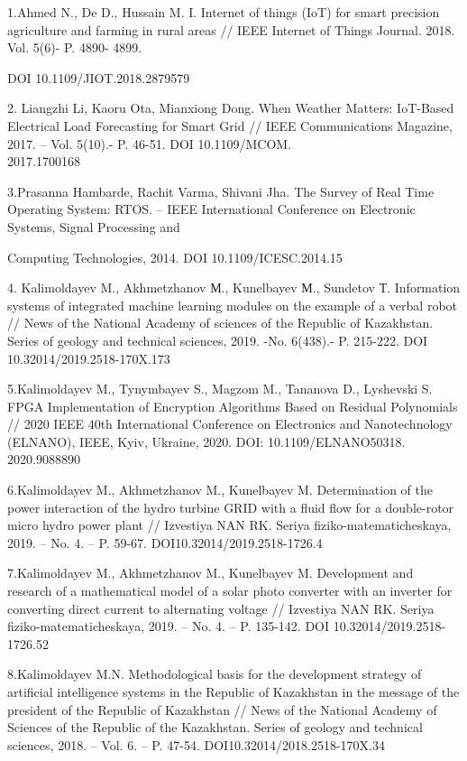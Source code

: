 \begin{noparindent}

1.Ahmed N., De D., Hussain M. I. Internet of things (IoT) for smart
precision agriculture and farming in rural areas // IEEE Internet of
Things Journal. 2018. Vol. 5(6)- P. 4890- 4899.

DOI 10.1109/JIOT.2018.2879579

2. Liangzhi Li, Kaoru Ota, Mianxiong Dong. When Weather Matters:
IoT-Based Electrical Load Forecasting for Smart Grid // IEEE
Communications Magazine, 2017. -- Vol. 5(10).- P. 46-51. DOI
10.1109/MCOM.\\2017.1700168

3.Prasanna Hambarde, Rachit Varma, Shivani Jha. The Survey of Real Time
Operating System: RTOS. -- IEEE International Conference on Electronic
Systems, Signal Processing and

Computing Technologies, 2014. DOI 10.1109/ICESC.2014.15

4. Kalimoldayev M., Akhmetzhanov М., Kunelbayev М., Sundetov Т.
Information systems of integrated machine learning modules on the
example of a verbal robot // News of the National Academy of sciences of
the Republic of Kazakhstan. Series of geology and technical sciences,
2019. -No. 6(438).- P. 215-222. DOI 10.32014/2019.2518-170X.173

5.Kalimoldayev M., Tynymbayev S., Magzom M., Tananova D., Lyshevski S.
FPGA Implementation of Encryption Algorithms Based on Residual
Polynomials // 2020 IEEE 40th International Conference on Electronics
and Nanotechnology (ELNANO), IEEE, Kyiv, Ukraine, 2020. DOI:
10.1109/ELNANO50318.\\2020.9088890

6.Kalimoldayev M., Akhmetzhanov M., Kunelbayev M. Determination of the
power interaction of the hydro turbine GRID with a fluid flow for a
double-rotor micro hydro power plant // Izvestiya NAN RK. Seriya
fiziko-matematicheskaya, 2019. -- No. 4. -- P. 59-67.
DOI10.32014/2019.2518-1726.4

7.Kalimoldayev M., Akhmetzhanov M., Kunelbayev M. Development and
research of a mathematical model of a solar photo converter with an
inverter for converting direct current to alternating voltage //
Izvestiya NAN RK. Seriya fiziko-matematicheskaya, 2019. -- No. 4. -- P.
135-142. DOI 10.32014/2019.2518-1726.52

8.Kalimoldayev M.N. Methodological basis for the development strategy of
artificial intelligence systems in the Republic of Kazakhstan in the
message of the president of the Republic of Kazakhstan // News of the
National Academy of Sciences of the Republic of the Kazakhstan. Series
of geology and technical sciences, 2018. -- Vol. 6. -- P. 47-54.
DOI10.32014/2018.2518-170X.34


\end{noparindent}
